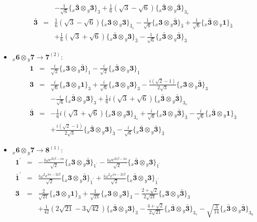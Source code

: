 \documentclass[english]{article}
\newcommand{\rep}[1]{\mathbf{#1}}
\newcommand{\repx}[2]{{}_{#2}\mathbf{#1}}
\newcommand{\subcg}[3]{\big\{ \repx{#1}{x}\otimes\repx{#2}{y}\big\}^{}_{#3}}
\begin{document}
\begin{itemize}
\begin{eqnarray*}
 & & -\frac{1}{\sqrt{6}}\subcg{\bar{3}}{3}{3}+\frac{1}{6} \left(\sqrt{3}-\sqrt{6}\right)\subcg{\bar{3}}{\bar{3}}{3_{s}}
\\
\rep{\bar{3}} &=& \frac{1}{6} \left(\sqrt{3}-\sqrt{6}\right)\subcg{3}{3}{\bar{3}_{s}}-\frac{1}{\sqrt{6}}\subcg{3}{\bar{3}}{\bar{3}}+\frac{1}{\sqrt{6}}\subcg{\bar{3}}{1}{\bar{3}} \\ 
 & & +\frac{1}{6} \left(\sqrt{3}+\sqrt{6}\right)\subcg{\bar{3}}{3}{\bar{3}}-\frac{1}{\sqrt{6}}\subcg{\bar{3}}{\bar{3}}{\bar{3}}
\end{eqnarray*}
\item $\repx{6}{x}\otimes\repx{7}{y}\to\rep{7}^{(2)}$:
\begin{eqnarray*}
\rep{1} &=& \frac{i}{\sqrt{2}}\subcg{3}{\bar{3}}{1}-\frac{i}{\sqrt{2}}\subcg{\bar{3}}{3}{1}
\\
\rep{3} &=& \frac{i}{\sqrt{6}}\subcg{3}{1}{3}+\frac{i}{\sqrt{6}}\subcg{3}{3}{3}-\frac{i \left(\sqrt{2}-1\right)}{2 \sqrt{3}}\subcg{3}{\bar{3}}{3} \\ 
 & & -\frac{i}{\sqrt{6}}\subcg{\bar{3}}{3}{3}+\frac{1}{6} i \left(\sqrt{3}+\sqrt{6}\right)\subcg{\bar{3}}{\bar{3}}{3_{s}}
\\
\rep{\bar{3}} &=& -\frac{1}{6} i \left(\sqrt{3}+\sqrt{6}\right)\subcg{3}{3}{\bar{3}_{s}}+\frac{i}{\sqrt{6}}\subcg{3}{\bar{3}}{\bar{3}}-\frac{i}{\sqrt{6}}\subcg{\bar{3}}{1}{\bar{3}} \\ 
 & & +\frac{i \left(\sqrt{2}-1\right)}{2 \sqrt{3}}\subcg{\bar{3}}{3}{\bar{3}}-\frac{i}{\sqrt{6}}\subcg{\bar{3}}{\bar{3}}{\bar{3}}
\end{eqnarray*}
\item $\repx{6}{x}\otimes\repx{7}{y}\to\rep{8}^{(1)}$:
\begin{eqnarray*}
\rep{1^{\prime}} &=& -\frac{i \omega  e^{2 i \beta -i \alpha }}{\sqrt{2}}\subcg{3}{\bar{3}}{1^{\prime}}-\frac{i \omega  e^{2 i \beta -i \alpha }}{\sqrt{2}}\subcg{\bar{3}}{3}{1^{\prime}}
\\
\rep{\bar{1}^{\prime}} &=& \frac{i \omega ^2 e^{i \alpha -2 i \beta }}{\sqrt{2}}\subcg{3}{\bar{3}}{\bar{1}^{\prime}}+\frac{i \omega ^2 e^{i \alpha -2 i \beta }}{\sqrt{2}}\subcg{\bar{3}}{3}{\bar{1}^{\prime}}
\\
\rep{3} &=& \frac{2}{\sqrt{21}}\subcg{3}{1}{3}+\frac{1}{\sqrt{21}}\subcg{3}{3}{3}-\frac{2+\sqrt{2}}{2 \sqrt{21}}\subcg{3}{\bar{3}}{3} \\ 
 & & +\frac{1}{42} \left(2 \sqrt{21}-3 \sqrt{42}\right)\subcg{\bar{3}}{3}{3}-\frac{4+\sqrt{2}}{2 \sqrt{21}}\subcg{\bar{3}}{\bar{3}}{3_{s}}-\sqrt{\frac{3}{14}}\subcg{\bar{3}}{\bar{3}}{3_{a}}

\end{eqnarray*}
\end{itemize}
\end{document}
